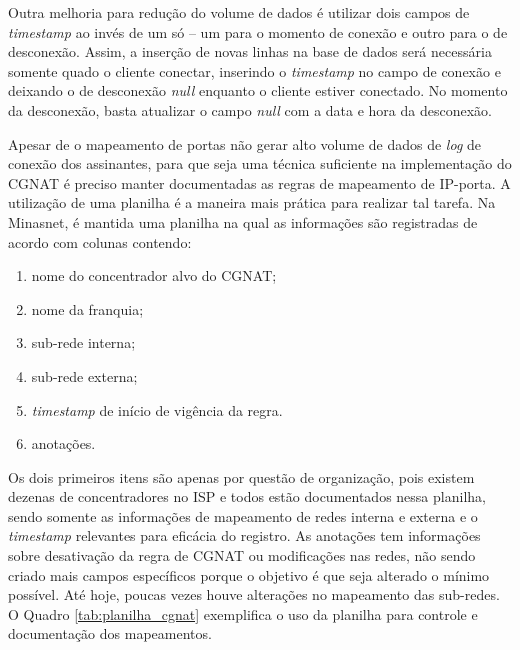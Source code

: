    Outra melhoria para redução do volume de dados é utilizar dois campos de \textit{timestamp} ao invés de um só -- um para o momento de conexão e outro para o de desconexão. Assim, a inserção de novas linhas na base de dados será necessária somente quado o cliente conectar, inserindo o \textit{timestamp} no campo de conexão e deixando o de desconexão \textit{null} enquanto o cliente estiver conectado. No momento da desconexão, basta atualizar o campo \textit{null} com a data e hora da desconexão.
 
   Apesar de o mapeamento de portas não gerar alto volume de dados de \textit{log} de conexão dos assinantes, para que seja uma técnica suficiente na implementação do CGNAT é preciso manter documentadas as regras de mapeamento de IP-porta. A utilização de uma planilha é a maneira mais prática para realizar tal tarefa. Na Minasnet, é mantida uma planilha na qual as informações são registradas de acordo com colunas contendo:

   \begin{enumerate}[label=\alph*)]
       \item nome do concentrador alvo do CGNAT;
       \item nome da franquia;
       \item sub-rede interna;
       \item sub-rede externa;
       \item \textit{timestamp} de início de vigência da regra.
       \item anotações.
   \end{enumerate}
   
   Os dois primeiros itens são apenas por questão de organização, pois existem dezenas de concentradores no ISP e todos estão documentados nessa planilha, sendo somente as informações de mapeamento de redes interna e externa e o \textit{timestamp} relevantes para eficácia do registro. As anotações tem informações sobre desativação da regra de CGNAT ou modificações nas redes, não sendo criado mais campos específicos porque o objetivo é que seja alterado o mínimo possível. Até hoje, poucas vezes houve alterações no mapeamento das sub-redes. O Quadro \ref{tab:planilha_cgnat} exemplifica o uso da planilha para controle e documentação dos mapeamentos.

